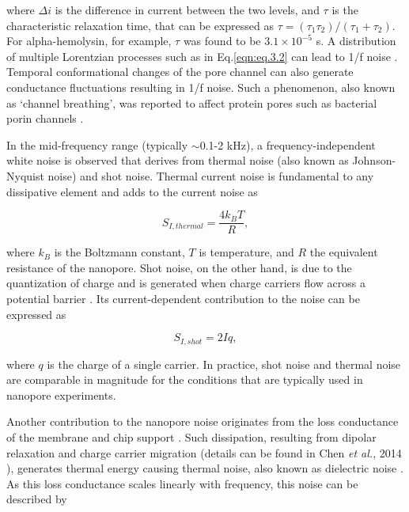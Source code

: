 \noindent where $\Delta i$ is the difference in current between the two levels, and $\tau$ is the characteristic relaxation time, that can be expressed as $\tau=(\tau_1\tau_2)/(\tau_1+\tau_2)$. For alpha-hemolysin, for example, $\tau$ was found to be $3.1\times 10^{-5}$ s\cite{Kasianowicz1995}. A distribution of multiple Lorentzian processes such as in Eq.\ref{eqn:eq.3.2} can lead to 1/f noise \cite{Dutta1981}. Temporal conformational changes of the pore channel can also generate conductance fluctuations resulting in 1/f noise. Such a phenomenon, also known as ‘channel breathing’, was reported to affect protein pores such as bacterial porin channels \cite{Wohnsland1997,Bezrukov2000}.

In the mid-frequency range (typically $\sim$0.1-2 kHz), a frequency-independent white noise is observed that derives from thermal noise (also known as Johnson-Nyquist noise) and shot noise. Thermal current noise is fundamental to any dissipative element \cite{Johnson1928,Nyquist1928} and adds to the current noise as


\begin{equation}\label{eqn:eq.3.3}
S_{I,thermal}=\frac{4k_BT}{R},
\end{equation}


\noindent where $k_B$ is the Boltzmann constant, $T$ is temperature, and $R$ the equivalent resistance of the nanopore. Shot noise, on the other hand, is due to the quantization of charge and is generated when charge carriers flow across a potential barrier \cite{Blanter2000,Schottky1918}. Its current-dependent contribution to the noise can be expressed as


\begin{equation}\label{eqn:eq.3.4}
S_{I,shot}=2Iq, 
\end{equation}

\noindent where $q$ is the charge of a single carrier. In practice, shot noise and thermal noise are comparable in magnitude for the conditions that are typically used in nanopore experiments. 


Another contribution to the nanopore noise originates from the loss conductance of the membrane and chip support \cite{Sakmann2009,Tabard-Cossa2013}. Such dissipation, resulting from dipolar relaxation and charge carrier migration (details can be found in Chen \emph{et al.}, 2014 \cite{Chen2004a}), generates thermal energy causing thermal noise, also known as dielectric noise \cite{Uram2008,Sherman-Gold2012}. As this loss conductance scales linearly with frequency, this noise can be described by


